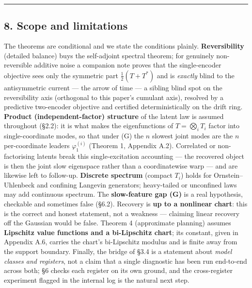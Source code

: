 \documentclass[
  letterpaper,
  11pt]{article}
\theoremstyle{plain}
\theoremstyle{definition}
\theoremstyle{remark}
\begin{document}
\begin{center}\rule{0.5\linewidth}{0.5pt}\end{center}

\subsection{8. Scope and limitations}\label{sec:scope}

The theorems are conditional and we state the conditions plainly. \textbf{Reversibility} (detailed balance) buys the self-adjoint spectral theorem; for genuinely non-reversible additive noise a companion note proves that the single-encoder objective sees only the symmetric part \(\tfrac12(T+T^{*})\) and is \emph{exactly} blind to the antisymmetric current --- the arrow of time --- a sibling blind spot on the reversibility axis (orthogonal to this paper's cumulant axis), resolved by a predictive two-encoder objective and certified deterministically on the drift ring. \textbf{Product (independent-factor) structure} of the latent law is assumed throughout (§2.2): it is what makes the eigenfunctions of \(T=\bigotimes_iT_i\) factor into single-coordinate modes, so that under (G) the \(n\) slowest joint modes are the \(n\) per-coordinate leaders \(\varphi_1^{(i)}\) (Theorem 1, Appendix A.2). Correlated or non-factorising latents break this single-excitation accounting --- the recovered object is then the joint slow eigenspace rather than a coordinatewise warp --- and are likewise left to follow-up. \textbf{Discrete spectrum} (compact \(T_i\)) holds for Ornstein--Uhlenbeck and confining Langevin generators; heavy-tailed or unconfined laws may add continuous spectrum. The \textbf{slow-feature gap (G)} is a real hypothesis, checkable and sometimes false (§6.2). Recovery is \textbf{up to a nonlinear chart}: this is the correct and honest statement, not a weakness --- claiming linear recovery off the Gaussian would be false. Theorem 4 (approximate planning) assumes \textbf{Lipschitz value functions and a bi-Lipschitz chart}; its constant, given in Appendix A.6, carries the chart's bi-Lipschitz modulus and is finite away from the support boundary. Finally, the bridge of §3.4 is a statement about \emph{model classes and registers}, not a claim that a single diagnostic has been run end-to-end across both; §6 checks each register on its own ground, and the cross-register experiment flagged in the internal log is the natural next step.
\end{document}
